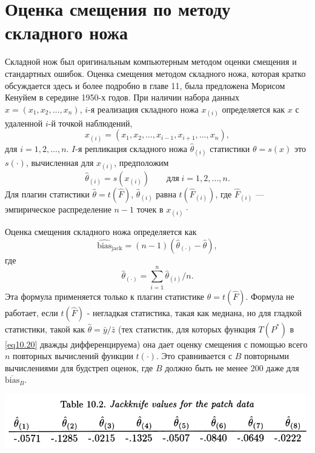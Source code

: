 \section{Оценка смещения по методу складного ножа}

Складной нож был оригинальным компьютерным методом оценки смещения и стандартных ошибок. Оценка смещения методом складного ножа, которая кратко обсуждается здесь и более подробно в главе 11, была предложена Морисом Кенуйем в середине 1950-х годов. При наличии набора данных $x = (x_1, x_2, \dots, x_n)$, $i$-я реализация складного ножа $x_{(i)}$ определяется как $x$ с удаленной $i$-й точкой наблюдений,
\begin{equation}\label{eq10.28}
    x_{(i)} = (x_1, x_2, \dots, x_{i-1}, x_{i+1}, \dots, x_n),
\end{equation}
для $i = 1, 2, \dots, n$. $I$-я репликация складного ножа $\hat{\theta}_{(i)}$ статистики $\theta = s(x)$ это $s(\cdot)$, вычисленная для $x_{(i)}$, предположим
\begin{equation}\label{eq10.29}
    \hat{\theta}_{(i)} = s(x_{(i)}) \quad\quad \text{для}\; i = 1, 2, \dots, n.
\end{equation}
Для плагин статистики $\hat{\theta} = t(\hat{F})$, $\hat{\theta}_{(i)}$ равна $t(\hat{F}_{(i)})$, где $\hat{F}_{(i)}$ --- эмпирическое распределение $n-1$ точек в $x_{(i)}$·

Оценка смещения складного ножа определяется как
\begin{equation}\label{eq10.30}
    \widehat{\text{bias}}_{\text{jack}} = (n-1)(\hat{\theta}_{(\cdot)} - \hat{\theta}),
\end{equation}
где
\begin{equation}\label{eq10.31}
    \hat{\theta}_{(\cdot)} = \sum\limits_{i=1}^{n}\hat{\theta}_{(i)}/n.
\end{equation}
Эта формула применяется только к плагин статистике $\hat{\theta} = t(\hat{F})$. Формула не работает, если $t(\hat{F})$ - негладкая статистика, такая как медиана, но для гладкой статистики, такой как $\hat{\theta} = \bar{y}/\bar{z}$ (тех статистик, для которых функция $T(P^{*})$ в \ref{eq10.20} дважды дифференцируема) она дает оценку смещения с помощью всего $n$ повторных вычислений функции $t(\cdot)$. Это сравнивается с $B$ повторными вычислениями для будстреп оценок, где $B$ должно быть не менее $200$ даже для $\overline{\text{bias}}_{B}$.

\noindent
\includegraphics[width=\linewidth]{10/t10.2.png}
\newline

